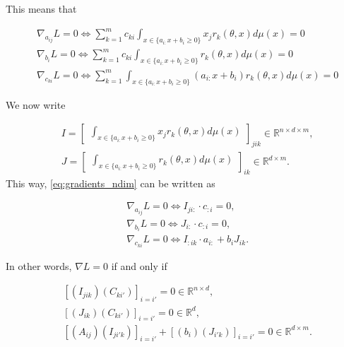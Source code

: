 \documentclass{article}
\newcommand{\RR}{\mathbb{R}}
\begin{document}
This means that

\begin{equation}\label{eq:gradients_ndim}
\begin{aligned}
&\nabla_{a_{ij}} L = 0 \Leftrightarrow \sum_{k=1}^m c_{ki} \int_{x \in \{a_{i:} x
+ b_i \ge 0\}}
x_j r_k(\theta,x) d\mu(x) = 0\\
&\nabla_{b_{i}} L = 0 \Leftrightarrow \sum_{k=1}^m c_{ki} \int_{x \in \{a_{i:} x
+ b_i \ge 0\}} r_k(\theta,x) d\mu(x) = 0 \\
&\nabla_{c_{ki}} L = 0 \Leftrightarrow
  \sum_{k=1}^m \int_{x \in \{a_{i:} x
+ b_i \ge 0\}} (a_{i:} x + b_i) r_k(\theta,x) d\mu(x) = 0
\end{aligned}
\end{equation}

We now write

\begin{equation}
\begin{aligned}
&I = \begin{bmatrix}
  \int_{x \in \{a_{i:} x
+ b_i \ge 0\}} x_j r_k(\theta,x)d\mu(x)
\end{bmatrix}_{jik} \in \RR^{n \times d \times m},\\
&J = \begin{bmatrix}
  \int_{x \in \{a_{i:} x
+ b_i \ge 0\}} r_k(\theta,x)d\mu(x)
\end{bmatrix}_{ik} \in \RR^{d\times m}.
\end{aligned}
\end{equation}
This way, \eqref{eq:gradients_ndim} can be written as

\begin{equation}
\begin{aligned}
&\nabla_{a_{ij}} L = 0 \Leftrightarrow  I_{ji:} \cdot c_{:i} = 0,\\
&\nabla_{b_{i}} L = 0 \Leftrightarrow J_{i:} \cdot c_{:i} = 0,\\
&\nabla_{c_{ki}} L = 0 \Leftrightarrow I_{:ik} \cdot a_{i:} + b_iJ_{ik}.
\end{aligned}
\end{equation}

In other words, $\nabla L = 0$ if and only if

\begin{equation}
\begin{aligned}
& [(I_{jik})(C_{ki'})]_{i=i'} = 0 \in \RR^{n \times d},\\
& [(J_{ik})(C_{ki'})]_{i=i'} = 0 \in \RR^d,\\
& [(A_{ij})(I_{ji'k})]_{i=i'} + [(b_i)(J_{i'k})]_{i=i'} = 0 \in \RR^{d\times
m}.\\
\end{aligned}
\end{equation}
\end{document}
